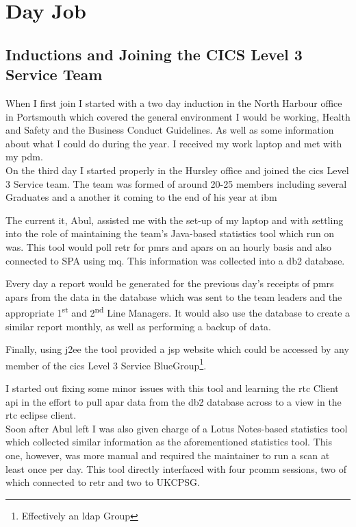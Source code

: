 \documentclass[a4paper,11pt]{report}
\begin{document}
\section{Day Job}


\subsection{Inductions and Joining the CICS Level 3 Service Team}
When I first join I started with a two day induction in the North Harbour office in Portsmouth 
which covered the general environment I would be working, Health and Safety and the Business 
Conduct Guidelines. As well as some information about what I could do during the year. I received
my work laptop and met with my \gls{pdm}. \\



On the third day I started properly in the Hursley office and joined the \gls{cics} Level 3 Service
team. The team was formed of around 20-25 members including several Graduates and a another 
\gls{it} coming to the end of his year at \gls{ibm}

The current \gls{it}, Abul, assisted me with the set-up of my laptop and with settling into the 
role of maintaining the team's Java-based statistics tool which run on \gls{was}. This tool would 
poll \gls{retr} for \gls{pmr}s and \gls{apar}s on an hourly basis and also connected to SPA using 
\gls{mq}. This information was collected into a \gls{db2} database.

Every day a report would be generated for the previous day's receipts of \gls{pmr}s \gls{apar}s 
from the data in the database which was sent to the team leaders and the appropriate 
1\textsuperscript{st} and 2\textsuperscript{nd} Line Managers. It would also use the database to
create a similar report monthly, as well as performing a backup of data.

Finally, using \gls{j2ee} the tool provided a \gls{jsp} website which could be accessed by any 
member of the \gls{cics} Level 3 Service BlueGroup\footnote{Effectively an \gls{ldap} Group}.

I started out fixing some minor issues with this tool and learning the \gls{rtc} Client \gls{api}
in the effort to pull \gls{apar} data from the \gls{db2} database across to a view in the \gls{rtc}
eclipse client. \\



Soon after Abul left I was also given charge of a Lotus Notes-based statistics tool which collected
similar information as the aforementioned statistics tool. This one, however, was more manual and
required the maintainer to run a scan at least once per day. This tool directly interfaced with 
four \gls{pcomm} sessions, two of which connected to \gls{retr} and two to UKCPSG.
\end{document}
